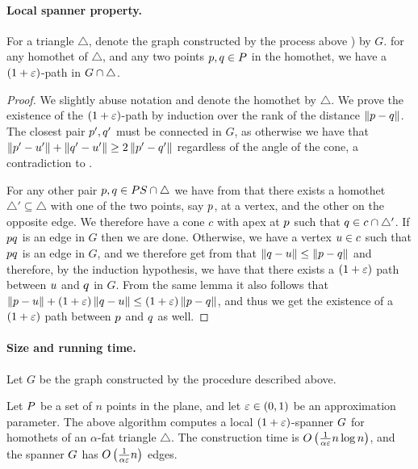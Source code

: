 \documentclass[12pt]{article}%
\begin{document}
\paragraph{Local spanner property.}
\begin{lemma}
    For a triangle $\triangle$, denote the graph constructed by the
    process above ) by $G$. for any homothet
    of $\triangle$, and any two points $p, q \in P$ in the
    homothet, we have a $(1+\varepsilon)$-path in
    $G \cap {\triangle}$.
\end{lemma}



\begin{proof}
    We slightly abuse notation and denote the homothet by
    $\triangle$. We prove the existence of the $(1+\varepsilon)$-path by
    induction over the rank of the distance $\left\| p - q \right\|$. The
    closest pair $p',q'$ must be connected in $G$, as otherwise we
    have that $\left\| p' - u' \right\|+\left\| q' - u' \right\|\geq 2 \left\| p' - q' \right\|$
    regardless of the angle of the cone, a contradiction to
    .
	
    For any other pair $p,q\in PS\cap \triangle$ we have from
     that there exists a homothet
    $\triangle'\subseteq \triangle$ with one of the two points, say
    $p$, at a vertex, and the other on the opposite edge. We
    therefore have a cone $c$ with apex at $p$ such that
    $q\in c\cap \triangle'$. If $pq$ is an edge in $G$ then we
    are done. Otherwise, we have a vertex $u\in c$ such that
    $pq$ is an edge in $G$, and we therefore get from
     that
    $\left\| q - u \right\|\leq \left\| p - q \right\|$ and therefore, by the induction
    hypothesis, we have that there exists a $(1+\varepsilon)$ path between
    $u$ and $q$ in $G$. From the same lemma it also follows that
    $\left\| p - u \right\|+(1+\varepsilon)\left\| q - u \right\|\leq(1+\varepsilon)\left\| p - q \right\|$,
    and thus we get the existence of a $(1+\varepsilon)$ path between $p$
    and $q$ as well.
	
\end{proof}


\paragraph{Size and running time.}
Let $G$ be the graph constructed by the procedure described above.


\begin{theorem}
    Let $P$ be a set of $n$ points in the plane, and let
    $\varepsilon \in (0,1)$ be an approximation parameter. The above
    algorithm computes a local $(1+\varepsilon)$-spanner $G$ for homothets
    of an $\alpha$-fat triangle $\triangle$.  The construction time is
    $O\left(\frac{1}{\alpha\varepsilon}n\log n\right)$, and the spanner $G$
    has $O\left(\frac{1}{\alpha\varepsilon}n\right)$ edges.
\end{theorem}
\end{document}
